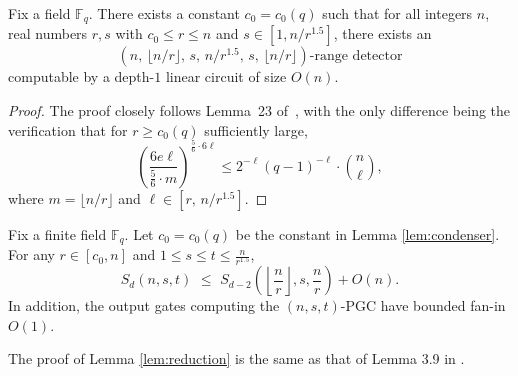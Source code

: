 \documentclass[11pt]{article}
\theoremstyle{named}
\begin{document}

\begin{lemma}
\label{lem:condenser}
Fix a field $\mathbb{F}_q$. There exists a constant $c_0 = c_0(q)$ such 
that for all integers $n$, real numbers $r, s$ with $c_0 \le r \le n$ 
and $s \in [1, n/r^{1.5}]$, there exists an
\[
(n,\, \lfloor n/r \rfloor,\, s,\, n/r^{1.5},\, s,\, \lfloor n/r \rfloor)
\text{-range detector}
\]
computable by a depth-$1$ linear circuit of size $O(n)$.
\end{lemma}
\begin{proof}
The proof closely follows Lemma~23 of~\cite{GHK+12}, with the only 
difference being the verification that for $r \ge c_0(q)$ sufficiently 
large,
\[
\left(\frac{6e\ell}{\frac{5}{6}\cdot m}\right)^{\frac{5}{6}\cdot 6\ell} 
\le 2^{-\ell}(q-1)^{-\ell}\cdot \binom{n}{\ell},
\]
where $m = \lfloor n/r \rfloor$ and $\ell \in [r,\, n/r^{1.5}]$.
\end{proof}

\begin{lemma} 
\label{lem:reduction}
Fix a finite field $\mathbb{F}_q$. Let $c_0 = c_0(q)$ be the constant in Lemma \ref{lem:condenser}.
 For any $r \in [c_0, n]$ and $1 \le s \le t \le \frac{n}{r^{1.5}}$,
\begin{equation}
\label{equ:red_ineq}
S_d(n, s, t) \,\,\le\,\, S_{d-2}\left(\left\lfloor \frac{n}{r} \right\rfloor, s, \frac{n}{r}\right) + O(n).
\end{equation}
In addition, the output gates computing the $(n, s, t)$-PGC have bounded fan-in $O(1)$.
\end{lemma}

The proof of Lemma \ref{lem:reduction} is the same as that of Lemma 3.9 in \cite{drucker2023minimum}.
\end{document}
